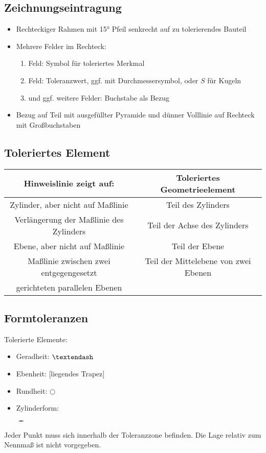 \documentclass[a4paper,DIV=15,fontsize=11pt]{scrartcl}
\begin{document}
\subsection{Zeichnungseintragung}
\begin{itemize}
	\item Rechteckiger Rahmen mit 15° Pfeil senkrecht auf zu tolerierendes Bauteil
	\item Mehrere Felder im Rechteck:
	      \begin{enumerate}
	      	\item Feld: Symbol für toleriertes Merkmal
	      	\item Feld: Toleranzwert, ggf. mit Durchmessersymbol, oder $S$ für Kugeln
	      	\item und ggf. weitere Felder: Buchstabe als Bezug
	      \end{enumerate}
	\item Bezug auf Teil mit ausgefüllter Pyramide und dünner Volllinie auf Rechteck mit Großbuchstaben
\end{itemize}

\subsection{Toleriertes Element}
\begin{tabular}{|c|c|}
	\hline
	\textbf{Hinweislinie zeigt auf:} & \textbf{Toleriertes Geometrieelement}\\
	\hline
	Zylinder, aber nicht auf Maßlinie & Teil des Zylinders\\
	\hline
	Verlängerung der Maßlinie des Zylinders & Teil der Achse des Zylinders\\
	\hline
	Ebene, aber nicht auf Maßlinie & Teil der Ebene\\
	\hline
	Maßlinie zwischen zwei entgegengesetzt & Teil der Mittelebene von zwei Ebenen \\ gerichteten parallelen Ebenen & \\
	\hline
\end{tabular}
	
\subsection{Formtoleranzen}
Tolerierte Elemente:
\begin{itemize}
	\item Geradheit: $\textendash$
	\item Ebenheit: [liegendes Trapez]
	\item Rundheit: $\bigcirc$
	\item Zylinderform: \begin{rotate}{40} $\eqcirc$ \end{rotate}
\end{itemize}
Jeder Punkt muss sich innerhalb der Toleranzzone befinden. Die Lage relativ zum Nennmaß ist nicht vorgegeben.
	
\end{document}
